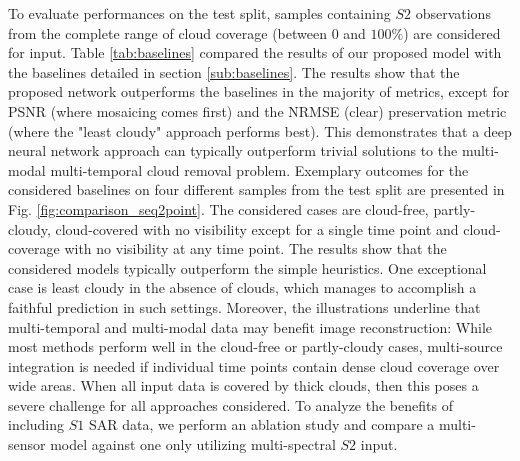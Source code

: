 \documentclass[journal]{IEEEtran}
\begin{document}
To evaluate performances on the test split, samples containing $S2$ observations from the complete range of cloud coverage (between $0$ and $100 \%$) are considered for input. Table \ref{tab:baselines} compared the results of our proposed model with the baselines detailed in section \ref{sub:baselines}. The results show that the proposed network outperforms the baselines in the majority of metrics, except for PSNR (where mosaicing comes first) and the NRMSE (clear) preservation metric (where the "least cloudy" approach performs best).  This demonstrates that a deep neural network approach can typically outperform trivial solutions to the multi-modal multi-temporal cloud removal problem. Exemplary outcomes for the considered baselines on four different samples from the test split are presented in Fig. \ref{fig:comparison_seq2point}. The considered cases are cloud-free, partly-cloudy, cloud-covered with no visibility except for a single time point and cloud-coverage with no visibility at any time point. The results show that the considered models typically outperform the simple heuristics. One exceptional case is least cloudy in the absence of clouds, which manages to accomplish a faithful prediction in such settings. Moreover, the illustrations underline that multi-temporal and multi-modal data may benefit image reconstruction: While most methods perform well in the cloud-free or partly-cloudy cases, multi-source integration is needed if individual time points contain dense cloud coverage over wide areas. When all input data is covered by thick clouds, then this poses a severe challenge for all approaches considered.
To analyze the benefits of including $S1$ SAR data, we perform an ablation study and compare a multi-sensor model against one only utilizing multi-spectral $S2$ input.
\end{document}
